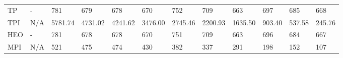 \begin{table*}
{\begin{tabular}{llllllllllll}
TP       &              - &                781 &                679 &                678 &                670 &                752 &                709 &                663 &               697 &                685 &                668 \\
TPI      &            N/A &            5781.74 &            4731.02 &            4241.62 &            3476.00 &            2745.46 &            2200.93 &            1635.50 &            903.40 &             537.58 &             245.76 \\
HEO      &              - &                781 &                678 &                678 &                670 &                751 &                709 &                663 &               696 &                684 &                667 \\
MPI      &            N/A &                521 &                475 &                474 &                430 &                382 &                337 &                291 &               198 &                152 &                107 \\
\bottomrule
\end{tabular}}
\end{table*}
